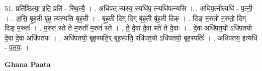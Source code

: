 \documentclass[17pt]{extarticle}
\begin{document}
51. प्रति॑ष्ठित्या॒ इति॒ प्रति॑ - स्थि॒त्यै॒ । . अधि॑पत् न्यस्य॒ स्यधि॑प॒ त्न्यधि॑पत्न्यसि । . अधि॑प॒त्नीत्यधि॑ - प॒त्नी॒ । . अ॒सि॒ बृ॒ह॒ती बृ॑ह॒ त्य॑स्यसि बृह॒ती । . बृ॒ह॒ती दिग् दिग् बृ॑ह॒ती बृ॑ह॒ती दिक् । . दिङ् म॒रुतो॑ म॒रुतो॒ दिग् दिङ् म॒रुतः॑ । . म॒रुत॑ स्ते ते म॒रुतो॑ म॒रुत॑ स्ते । . ते॒ दे॒वा दे॒वा स्ते॑ ते दे॒वाः । . दे॒वा अधि॑पत॒यो ऽधि॑पतयो दे॒वा दे॒वा अधि॑पतयः । . अधि॑पतयो॒ बृह॒स्पति॒र् बृह॒स्पति॒ रधि॑पत॒यो ऽधि॑पतयो॒ बृह॒स्पतिः॑ । . अधि॑पतय॒ इत्यधि॑ - प॒त॒यः॒ । \newline

\textbf{Ghana Paata } \newline
\end{document}

